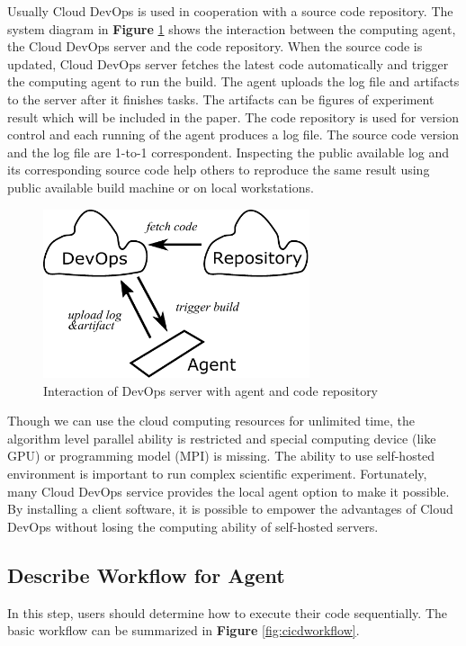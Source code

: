 \documentclass{IEEEcsmag}
\begin{document}
Usually Cloud DevOps is used in cooperation with a source code repository. The system diagram in \textbf{Figure} \ref{fig:principal} shows the interaction between the computing agent, the Cloud DevOps server and the code repository. When the source code is updated, Cloud DevOps server fetches the latest code automatically and trigger the computing agent to run the build. The agent uploads the log file and artifacts to the server after it finishes tasks. The artifacts can be figures of experiment result which will be included in the paper. 
The code repository is used for version control and each running of the agent produces a log file. The source code version and the log file are 1-to-1 correspondent. Inspecting the public available log and its corresponding source code help others to reproduce the same result using public available build machine or on local workstations.

\begin{figure}[!ht]
\centerline{\includegraphics[width=18.5pc]{principal.pdf}}
\caption{Interaction of DevOps server with agent and code repository}\label{fig:principal}
\end{figure}

Though we can use the cloud computing resources for unlimited time, the algorithm level parallel ability is restricted and special computing device (like GPU) or programming model (MPI) is missing. The ability to use self-hosted environment is important to run complex scientific experiment. Fortunately, many Cloud DevOps service provides the local agent option to make it possible. By installing a client software, it is possible to empower the advantages of Cloud DevOps without losing the computing ability of self-hosted servers. 
\subsection{Describe Workflow for Agent}
In this step, users should determine how to execute their code sequentially. The basic workflow can be summarized in \textbf{Figure} \ref{fig:cicdworkflow}.
\end{document}
